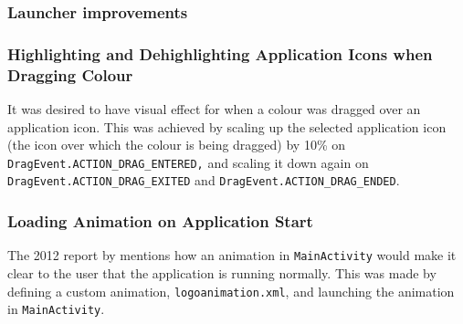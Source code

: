 \subsubsection{Launcher improvements}

\subsubsection*{Highlighting and Dehighlighting Application Icons when Dragging Colour}
It was desired to have visual effect for when a colour was dragged over an application icon.
This was achieved by scaling up the selected application icon (the icon over which the colour is being dragged) by 10\% on \lstinline{DragEvent.ACTION_DRAG_ENTERED,} and scaling it down again on \lstinline{DragEvent.ACTION_DRAG_EXITED} and \lstinline{DragEvent.ACTION_DRAG_ENDED}.

\subsubsection*{Loading Animation on Application Start}
The 2012 report by \citet{launcher2012} mentions how an animation in \lstinline{MainActivity} would make it clear to the user that the application is running normally.
This was made by defining a custom animation, \lstinline{logoanimation.xml}, and launching the animation in \lstinline{MainActivity}.

